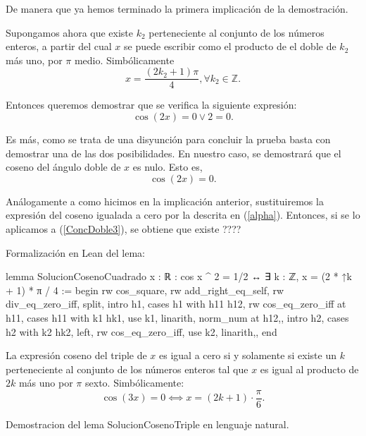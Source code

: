 \begin{demostracion}
  De manera que ya hemos terminado la primera implicación de la
  demostración.

   \noindent
   \framebox{\longrightarrow} Supongamos ahora que existe  \(k_2\)
   perteneciente al conjunto de los números enteros, a partir del
   cual \(x\) se puede escribir como el producto de el doble de
   \(k_2 \) más uno, por \( π \) medio. Simbólicamente
   \begin{equation}\label{hk2}\tag{hk2}
      x=\frac{(2k_2+1)π}{4}, ∀ k_2 ∈ ℤ.
    \end{equation}

    Entonces queremos demostrar que se verifica la siguiente
    expresión:
    \begin{equation}\label{ConcDoble2}
      \cos(2x)=0 \lor 2=0.
    \end{equation}

    Es más, como se trata de una disyunción para concluir la
    prueba basta con demostrar una de las dos posibilidades.
    En nuestro caso, se demostrará que el coseno del ángulo doble
    de \(x\) es nulo. Esto es,
    \begin{equation}\label{ConcDoble3}
      \cos(2x)=0.
    \end{equation}

    Análogamente a como hicimos en la implicación anterior,
    sustituiremos la expresión del coseno igualada a cero por la
    descrita en (\ref{alpha}). Entonces, si se lo aplicamos a
    (\ref{ConcDoble3}), se obtiene que existe ????
    \end{demostracion}

Formalización en Lean del lema:
\begin{leancode}
lemma SolucionCosenoCuadrado {x : ℝ} : cos x ^ 2 = 1/2 ↔
∃ k : ℤ, x = (2 * ↑k + 1) * π / 4 :=
begin
  rw cos_square,
  rw add_right_eq_self,
  rw div_eq_zero_iff,
  split,
  {intro h1,
  cases h1 with h11 h12,
  rw cos_eq_zero_iff at h11,
  cases h11 with k1 hk1,
  use k1,
  linarith,
  norm_num at h12,},
  {intro h2, 
  cases h2 with k2 hk2,
  left,
  rw cos_eq_zero_iff,
  use k2,
  linarith,},
end
\end{leancode}


\begin{lema}[SolucionCosenoTriple]La expresión coseno del
  triple de \(x\) es igual a cero si y solamente si
  existe un \(k\) perteneciente al conjunto de los números
  enteros tal que \(x\) es igual al producto de \(2k\) más
  uno por \(π\) sexto. Simbólicamente:
  \begin{equation}
    \cos(3x)=0 ⟺ x=(2k+1)⋅\frac{π}{6}.
  \end{equation}
\end{lema}
\begin{demostracion}
  Demostracion del lema SolucionCosenoTriple en lenguaje
  natural.
\end{demostracion}

